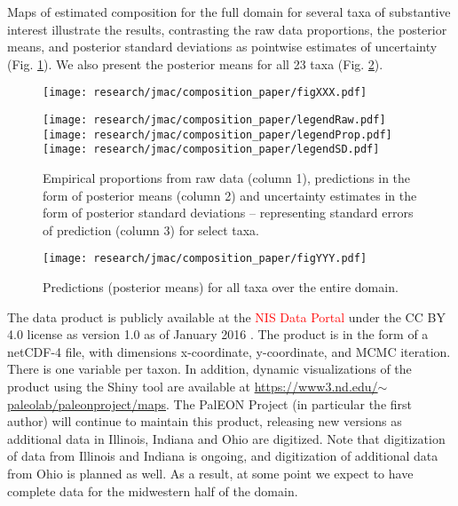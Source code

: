 \documentclass[12pt]{article}\usepackage[]{graphicx}\usepackage[]{color}
\begin{document}
Maps of estimated composition for the full domain for several taxa
of substantive interest illustrate the results, contrasting the raw
data proportions, the posterior means, and posterior standard deviations
as pointwise estimates of uncertainty (Fig. \ref{fig:select_maps}).
We also present the posterior means for all 23 taxa (Fig. \ref{fig:all_predictions}).

\begin{figure}
\texttt{[image: research/jmac/composition\_paper/figXXX.pdf]}

\hspace{4mm}\texttt{[image: research/jmac/composition\_paper/legendRaw.pdf]}\hspace{4mm}\texttt{[image: research/jmac/composition\_paper/legendProp.pdf]}\hspace{3.5mm}\texttt{[image: research/jmac/composition\_paper/legendSD.pdf]}

\caption{Empirical proportions from raw data (column 1), predictions in the
form of posterior means (column 2) and uncertainty estimates in the
form of posterior standard deviations -- representing standard errors
of prediction (column 3) for select taxa. \label{fig:select_maps}}
\end{figure}


\begin{figure}
\texttt{[image: research/jmac/composition\_paper/figYYY.pdf]}

\caption{Predictions (posterior means) for all taxa over the entire domain.\label{fig:all_predictions}}


\end{figure}


The data product is publicly available at the \textcolor{red}{NIS
Data Portal }under the CC BY 4.0 license as version 1.0 as of January
2016 \citep{paci:etal:data:2016}. The product is in the form of a
netCDF-4 file, with dimensions x-coordinate, y-coordinate, and MCMC
iteration. There is one variable per taxon. In addition, dynamic visualizations
of the product using the Shiny tool are available at \href{https://www3.nd.edu/~paleolab/paleonproject/maps}{https://www3.nd.edu/$\sim$paleolab/paleonproject/maps}.
The PalEON Project (in particular the first author) will continue
to maintain this product, releasing new versions as additional data
in Illinois, Indiana and Ohio are digitized. Note that digitization
of data from Illinois and Indiana is ongoing, and digitization of
additional data from Ohio is planned as well. As a result, at some
point we expect to have complete data for the midwestern half of the
domain. 
\end{document}
